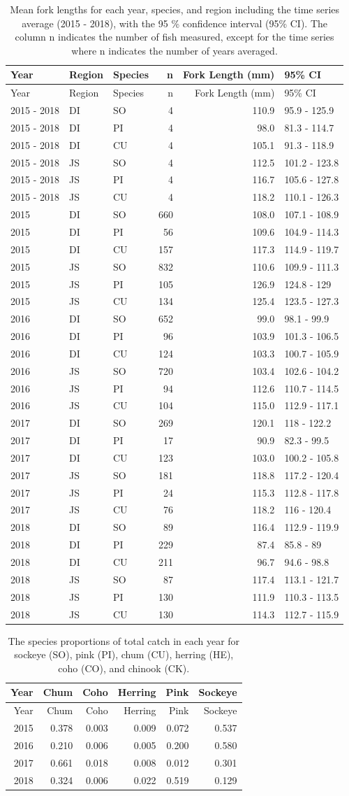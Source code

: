 \documentclass[fleqn,10pt]{wlpeerj} %
\begin{document}
\begin{longtable}[]{@{}lllrrl@{}}
\caption{\label{tab:length} Mean fork lengths for each year, species, and
region including the time series average (2015 - 2018), with the 95 \%
confidence interval (95\% CI). The column n indicates the number of fish
measured, except for the time series where n indicates the number of
years averaged.}\tabularnewline
\toprule
Year & Region & Species & n & Fork Length (mm) & 95\% CI\tabularnewline
\midrule
\endfirsthead
\toprule
Year & Region & Species & n & Fork Length (mm) & 95\% CI\tabularnewline
\midrule
\endhead
2015 - 2018 & DI & SO & 4 & 110.9 & 95.9 - 125.9\tabularnewline
2015 - 2018 & DI & PI & 4 & 98.0 & 81.3 - 114.7\tabularnewline
2015 - 2018 & DI & CU & 4 & 105.1 & 91.3 - 118.9\tabularnewline
2015 - 2018 & JS & SO & 4 & 112.5 & 101.2 - 123.8\tabularnewline
2015 - 2018 & JS & PI & 4 & 116.7 & 105.6 - 127.8\tabularnewline
2015 - 2018 & JS & CU & 4 & 118.2 & 110.1 - 126.3\tabularnewline
2015 & DI & SO & 660 & 108.0 & 107.1 - 108.9\tabularnewline
2015 & DI & PI & 56 & 109.6 & 104.9 - 114.3\tabularnewline
2015 & DI & CU & 157 & 117.3 & 114.9 - 119.7\tabularnewline
2015 & JS & SO & 832 & 110.6 & 109.9 - 111.3\tabularnewline
2015 & JS & PI & 105 & 126.9 & 124.8 - 129\tabularnewline
2015 & JS & CU & 134 & 125.4 & 123.5 - 127.3\tabularnewline
2016 & DI & SO & 652 & 99.0 & 98.1 - 99.9\tabularnewline
2016 & DI & PI & 96 & 103.9 & 101.3 - 106.5\tabularnewline
2016 & DI & CU & 124 & 103.3 & 100.7 - 105.9\tabularnewline
2016 & JS & SO & 720 & 103.4 & 102.6 - 104.2\tabularnewline
2016 & JS & PI & 94 & 112.6 & 110.7 - 114.5\tabularnewline
2016 & JS & CU & 104 & 115.0 & 112.9 - 117.1\tabularnewline
2017 & DI & SO & 269 & 120.1 & 118 - 122.2\tabularnewline
2017 & DI & PI & 17 & 90.9 & 82.3 - 99.5\tabularnewline
2017 & DI & CU & 123 & 103.0 & 100.2 - 105.8\tabularnewline
2017 & JS & SO & 181 & 118.8 & 117.2 - 120.4\tabularnewline
2017 & JS & PI & 24 & 115.3 & 112.8 - 117.8\tabularnewline
2017 & JS & CU & 76 & 118.2 & 116 - 120.4\tabularnewline
2018 & DI & SO & 89 & 116.4 & 112.9 - 119.9\tabularnewline
2018 & DI & PI & 229 & 87.4 & 85.8 - 89\tabularnewline
2018 & DI & CU & 211 & 96.7 & 94.6 - 98.8\tabularnewline
2018 & JS & SO & 87 & 117.4 & 113.1 - 121.7\tabularnewline
2018 & JS & PI & 130 & 111.9 & 110.3 - 113.5\tabularnewline
2018 & JS & CU & 130 & 114.3 & 112.7 - 115.9\tabularnewline
\bottomrule
\end{longtable}

\begin{longtable}[]{@{}rrrrrr@{}}
\caption{\label{tab:proptable} The species proportions of total catch in
each year for sockeye (SO), pink (PI), chum (CU), herring (HE), coho
(CO), and chinook (CK).}\tabularnewline
\toprule
Year & Chum & Coho & Herring & Pink & Sockeye\tabularnewline
\midrule
\endfirsthead
\toprule
Year & Chum & Coho & Herring & Pink & Sockeye\tabularnewline
\midrule
\endhead
2015 & 0.378 & 0.003 & 0.009 & 0.072 & 0.537\tabularnewline
2016 & 0.210 & 0.006 & 0.005 & 0.200 & 0.580\tabularnewline
2017 & 0.661 & 0.018 & 0.008 & 0.012 & 0.301\tabularnewline
2018 & 0.324 & 0.006 & 0.022 & 0.519 & 0.129\tabularnewline
\bottomrule
\end{longtable}
\end{document}
